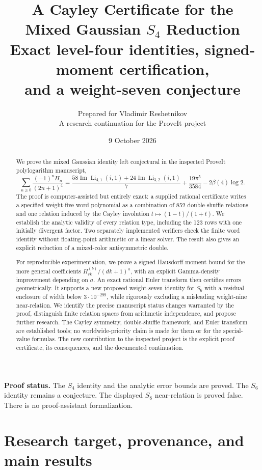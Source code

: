 \documentclass[11pt,letterpaper]{article}
\title{\textbf{A Cayley Certificate for the\\Mixed Gaussian $S_4$ Reduction}\\[7pt]
\large Exact level-four identities, signed-moment certification,\\
and a weight-seven conjecture}
\author{Prepared for Vladimir Reshetnikov\\
\small A research continuation for the ProveIt project}
\date{9 October 2026}
\numberwithin{equation}{section}
\theoremstyle{definition}
\DeclareMathOperator{\Li}{Li}
\DeclareMathOperator{\Imag}{Im}
\begin{document}
\maketitle
\begin{abstract}
We prove the mixed Gaussian identity left conjectural in the inspected
ProveIt polylogarithm manuscript,
\[
\sum_{n\ge0}\frac{(-1)^nH_n}{(2n+1)^4}
 =\frac{58\Imag\Li_{4,1}(i,1)+24\Imag\Li_{3,2}(i,1)}7
  +\frac{19\pi^5}{3584}-2\beta(4)\log2.
\]
The proof is computer-assisted but entirely exact: a supplied rational
certificate writes a specified weight-five word polynomial as a combination
of 852 double-shuffle relations and one relation induced by the Cayley
involution $t\mapsto(1-t)/(1+t)$. We establish the analytic validity of every
relation type, including the 123 rows with one initially divergent factor.
Two separately implemented verifiers check the finite word identity without
floating-point arithmetic or a linear solver. The result also gives an
explicit reduction of a mixed-color antisymmetric double.

For reproducible experimentation, we prove a signed-Hausdorff-moment bound
for the more general coefficients $H_{rk}^{(b)}/(dk+1)^a$, with an explicit
Gamma-density improvement depending on $a$. An exact rational Euler
transform then certifies errors geometrically. It supports a new proposed
weight-seven identity for $S_6$ with a residual enclosure of width below
$3\cdot10^{-299}$, while rigorously excluding a misleading weight-nine
near-relation. We identify the precise manuscript status changes warranted
by the proof, distinguish finite relation spaces from arithmetic
independence, and propose further research. The Cayley symmetry,
double-shuffle framework, and Euler transform are established tools;
no worldwide-priority claim is made for them or for the special-value
formulas. The new contribution to the inspected project is the explicit
proof certificate, its consequences, and the documented continuation.
\end{abstract}

\vfill
\noindent\textbf{Proof status.} The $S_4$ identity and the analytic error bounds
are proved. The $S_6$ identity remains a conjecture. The displayed $S_8$
near-relation is proved false. There is no proof-assistant formalization.
\newpage
\begingroup
\small
\setlength{\parskip}{0pt}
\tableofcontents
\endgroup
\newpage

\section{Research target, provenance, and main results}
\label{sec:intro}
\end{document}
